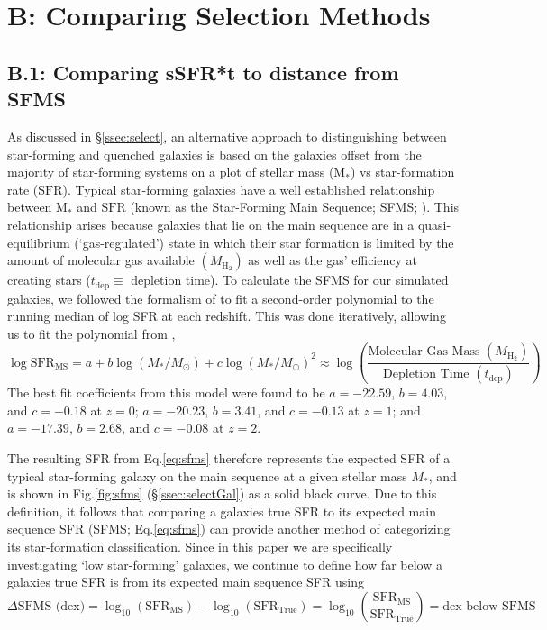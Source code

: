 \documentclass[twocolumn, linenumbers]{aastex631}
\newcommand{\mhh}{M_{\text{H}_2}}
\newcommand{\sfr}{\text{SFR}}
\newcommand{\eq}{Eq.\hspace{.2em}}
\renewcommand{\fig}{Fig.\hspace{.2em}}
\begin{document}
\section{B: Comparing Selection Methods}
\subsection{B.1: Comparing sSFR*t to distance from SFMS}
\label{app:ssfrCompare}
As discussed in \S\ref{ssec:select}, an alternative approach to distinguishing between star-forming and quenched galaxies is based on the galaxies offset from the majority of star-forming systems on a plot of stellar mass ($\text{M}_{*}$) vs star-formation rate ($\sfr$).  Typical star-forming galaxies have a well established relationship between $\text{M}_{*}$ and $\sfr$ (known as the Star-Forming Main Sequence; SFMS; \citealt{noeske, whitaker12, sfms,Speagle14}).  This relationship arises because galaxies that lie on the main sequence are in a quasi-equilibrium (`gas-regulated') state  \citep{tacconi} in which their star formation is limited by the amount of molecular gas available $(\mhh)$ as well as the gas' efficiency at creating stars ($t_{\text{dep}}\equiv $ depletion time).
To calculate the SFMS for our simulated galaxies, we followed the formalism of \cite{sfms} to fit a second-order polynomial to the running median of log SFR at each redshift.  This was done iteratively, allowing us to fit the polynomial from \cite{sfms}, 
\begin{equation}
\log \text{SFR}_{\text{MS}}=a+b\log(M_*/M_\odot)+c\log(M_*/M_\odot)^2\approx\log \left(\frac{\text{Molecular Gas Mass } (\mhh)}{\text{Depletion Time } (t_{\text{dep}})}\right)
\label{eq:sfms}
\end{equation}
The best fit coefficients from this model were found to be $a=-22.59$, $b=4.03$, and $c=-0.18$ at $z=0$; $a=-20.23$, $b=3.41$, and $c=-0.13$ at $z=1$; and $a=-17.39$, $b=2.68$, and $c=-0.08$ at $z=2$.

The resulting SFR from \eq \ref{eq:sfms} therefore represents the expected SFR of a typical star-forming galaxy on the main sequence at a given stellar mass $M_*$, and is shown in \fig\ref{fig:sfms} (\S\ref{ssec:selectGal}) as a solid black curve.  Due to this definition, it follows that comparing a galaxies true SFR to its expected main sequence SFR (SFMS; \eq\ref{eq:sfms}) can provide another method of categorizing its star-formation classification.  Since in this paper we are specifically investigating `low star-forming' galaxies, we continue to define how far below a galaxies true SFR is from its expected main sequence SFR using
\begin{equation}
    \Delta \text{SFMS (dex)}=\log_{10}(\text{SFR}_{\text{MS}})-\log_{10}(\text{SFR}_{\text{True}})=\log_{10}\left(\frac{\text{SFR}_{\text{MS}}}{\text{SFR}_{\text{True}}}\right)=\text{dex below SFMS}
    \label{eq:deltaSFMS}
\end{equation}
\end{document}

